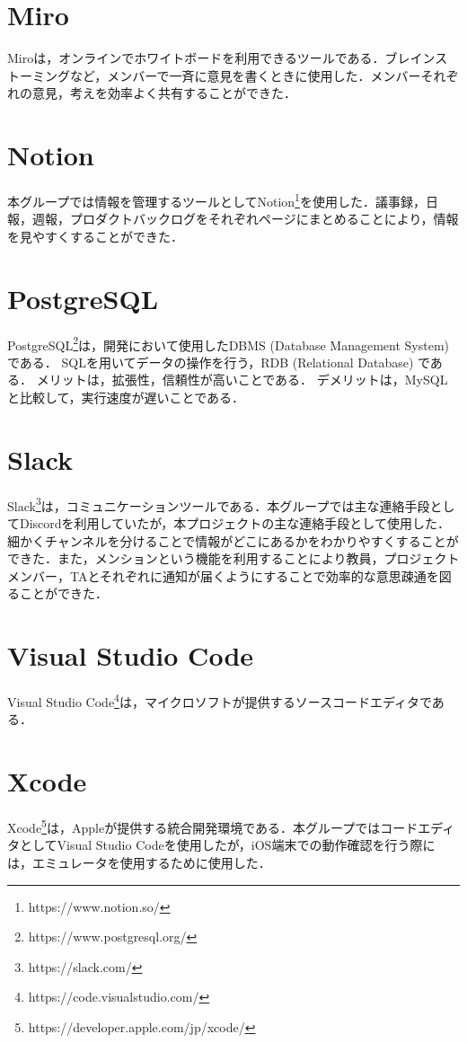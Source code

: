 \section{Miro}
Miroは，オンラインでホワイトボードを利用できるツールである．ブレインストーミングなど，メンバーで一斉に意見を書くときに使用した．メンバーそれぞれの意見，考えを効率よく共有することができた．

\section{Notion}
本グループでは情報を管理するツールとしてNotion\footnote{https://www.notion.so/}を使用した．議事録，日報，週報，プロダクトバックログをそれぞれページにまとめることにより，情報を見やすくすることができた．

\section{PostgreSQL}
PostgreSQL\footnote{https://www.postgresql.org/}は，開発において使用したDBMS (Database Management System) である．
SQLを用いてデータの操作を行う，RDB (Relational Database) である．
メリットは，拡張性，信頼性が高いことである．
デメリットは，MySQLと比較して，実行速度が遅いことである．

\section{Slack}
Slack\footnote{https://slack.com/}は，コミュニケーションツールである．本グループでは主な連絡手段としてDiscordを利用していたが，本プロジェクトの主な連絡手段として使用した．細かくチャンネルを分けることで情報がどこにあるかをわかりやすくすることができた．また，メンションという機能を利用することにより教員，プロジェクトメンバー，TAとそれぞれに通知が届くようにすることで効率的な意思疎通を図ることができた．

\section{Visual Studio Code}
Visual Studio Code\footnote{https://code.visualstudio.com/}は，マイクロソフトが提供するソースコードエディタである．

\section{Xcode}
Xcode\footnote{https://developer.apple.com/jp/xcode/}は，Appleが提供する統合開発環境である．本グループではコードエディタとしてVisual Studio Codeを使用したが，iOS端末での動作確認を行う際には，エミュレータを使用するために使用した．

